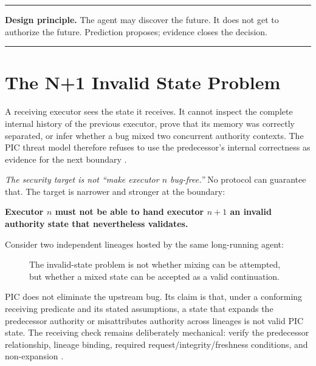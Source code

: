 \documentclass[10pt,oneside,openany]{book}
\newcommand{\principle}[1]{%
  \vspace{4pt}
  \noindent\begin{minipage}{\linewidth}
  \hrule\vspace{5pt}
  \small\sffamily\raggedright\textbf{Design principle.} #1
  \vspace{5pt}\hrule
  \end{minipage}\vspace{4pt}
}
\begin{document}
\principle{The agent may discover the future. It does not get to authorize the future. Prediction proposes; evidence closes the decision.}

\chapter{The N+1 Invalid State Problem}

A receiving executor sees the state it receives. It cannot inspect the complete internal history of the previous executor, prove that its memory was correctly separated, or infer whether a bug mixed two concurrent authority contexts. The PIC threat model therefore refuses to use the predecessor's internal correctness as evidence for the next boundary \cite{picwhy}.

\emph{The security target is not ``make executor $n$ bug-free.''} No protocol can guarantee that. The target is narrower and stronger at the boundary:

\begin{center}
\sffamily\bfseries
Executor $n$ must not be able to hand executor $n+1$ an invalid authority state that nevertheless validates.
\end{center}

Consider two independent lineages hosted by the same long-running agent:

\begin{figure}[ht]
\centering
{}
\caption{The invalid-state problem is not whether mixing can be attempted, but whether a mixed state can be accepted as a valid continuation.}
\end{figure}

PIC does not eliminate the upstream bug. Its claim is that, under a conforming receiving predicate and its stated assumptions, a state that expands the predecessor authority or misattributes authority across lineages is not valid PIC state. The receiving check remains deliberately mechanical: verify the predecessor relationship, lineage binding, required request/integrity/freshness conditions, and non-expansion \cite{picwhy}.
\end{document}
